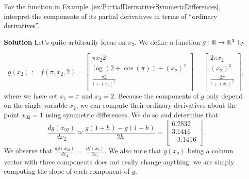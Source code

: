   \begin{example}
 \label{ex:PartialDerivativesSymmericDifferencesInterpretation}
For the function in Example~\ref{ex:PartialDerivativesSymmericDifferences}, interpret the components of its partial derivatives in terms of ``ordinary derivatives''.
 \end{example}
 
  \textbf{Solution} Let's quite arbitrarily focus on $x_2$. We define a function $g: \mathbb R \to \mathbb R^3$ by
  
  $$g(x_2) :=f(\pi,x_2,2) = \left[
\begin{array}{c}
\pi x_2 2 \\
\log(2+\cos(\pi)) + (x_2)^{\pi} \\
 \frac{\pi 2}{1+ (x_2)^2} \\
\end{array}
\right] = \left[
\begin{array}{c}
2 \pi  x_2 \\
(x_2)^{\pi} \\
 \frac{2 \pi }{1+ (x_2)^2} \\
\end{array}
\right],$$
where we have set $x_1 = \pi$ and $x_3=2$. Because the components of $g$ only depend on the single variable $x_2$, we can compute their ordinary derivatives about the point $x_{02} = 1$ using symmetric differences. We do so and determine that
$$ \frac{dg(x_{02})}{dx_2} \approx \frac{g(1+h)-g(1-h)}{2 h} = 
\left[
\begin{array}{r}
6.2832 \\
3.1416 \\
-3.1416 \\
\end{array}
\right]
.$$
We observe that $\frac{dg(x_{02})}{dx_2} = ~\frac{\partial f(x_0)}{\partial x_2}$. We also note that $g(x_2) $ being a column vector with three components does not really change anything: we are simply computing the slope of each component of $g$. 
  
  \Qed
  
  \vspace*{0.2cm}
  
